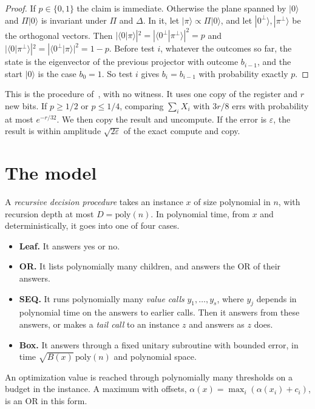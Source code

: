\documentclass[11pt]{article}
\theoremstyle{definition}
\theoremstyle{remark}
\newcommand{\poly}{\mathrm{poly}}
\begin{document}
\begin{proof}
If $p\in\{0,1\}$ the claim is immediate. Otherwise the plane spanned by $|0\rangle$ and $\Pi|0\rangle$ is invariant under $\Pi$ and $\Delta$. In it, let $|\pi\rangle\propto\Pi|0\rangle$, and let $|0^\perp\rangle,|\pi^\perp\rangle$ be the orthogonal vectors. Then $|\langle0|\pi\rangle|^2=|\langle0^\perp|\pi^\perp\rangle|^2=p$ and $|\langle0|\pi^\perp\rangle|^2=|\langle0^\perp|\pi\rangle|^2=1-p$. Before test $i$, whatever the outcomes so far, the state is the eigenvector of the previous projector with outcome $b_{i-1}$, and the start $|0\rangle$ is the case $b_0=1$. So test $i$ gives $b_i=b_{i-1}$ with probability exactly $p$. \end{proof}

This is the procedure of~\cite{MW05}, with no witness. It uses one copy of the register and $r$ new bits. If $p\ge1/2$ or $p\le1/4$, comparing $\sum_i X_i$ with $3r/8$ errs with probability at most $e^{-r/32}$. We then copy the result and uncompute. If the error is $\varepsilon$, the result is within amplitude $\sqrt{2\varepsilon}$ of the exact compute and copy.

\section{The model}\label{sec:model}

A \emph{recursive decision procedure} takes an instance $x$ of size polynomial in $n$, with recursion depth at most $D=\poly(n)$. In polynomial time, from $x$ and deterministically, it goes into one of four cases.
\begin{itemize}[leftmargin=1.5em]
\item \textbf{Leaf.} It answers yes or no.
\item \textbf{OR.} It lists polynomially many children, and answers the OR of their answers.
\item \textbf{SEQ.} It runs polynomially many \emph{value calls} $y_1,\dots,y_s$, where $y_j$ depends in polynomial time on the answers to earlier calls. Then it answers from these answers, or makes a \emph{tail call} to an instance $z$ and answers as $z$ does.
\item \textbf{Box.} It answers through a fixed unitary subroutine with bounded error, in time $\sqrt{B(x)}\,\poly(n)$ and polynomial space.
\end{itemize}
An optimization value is reached through polynomially many thresholds on a budget in the instance. A maximum with offsets, $\alpha(x)=\max_i(\alpha(x_i)+c_i)$, is an OR in this form.
\end{document}
